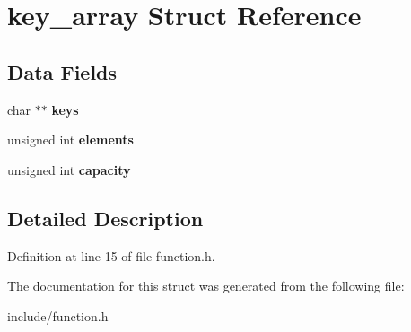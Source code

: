 \hypertarget{structkey__array}{}\section{key\+\_\+array Struct Reference}
\label{structkey__array}
\subsection*{Data Fields}
\begin{DoxyCompactItemize}
\item 
\mbox{\label{structkey__array_a2ce96f3f3b0eb52493c22f144076d5b7}} 
char $\ast$$\ast$ {\bfseries keys}
\item 
\mbox{\label{structkey__array_a376aed93b31e42f137d740ecdc4997f3}} 
unsigned int {\bfseries elements}
\item 
\mbox{\label{structkey__array_adee97a3d561480e44679de19e11ce02e}} 
unsigned int {\bfseries capacity}
\end{DoxyCompactItemize}


\subsection{Detailed Description}


Definition at line 15 of file function.\+h.



The documentation for this struct was generated from the following file\+:\begin{DoxyCompactItemize}
\item 
include/function.\+h\end{DoxyCompactItemize}
